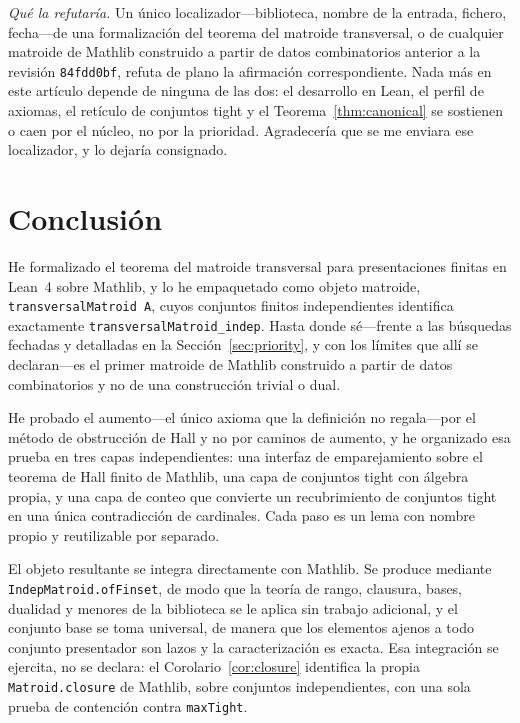 \documentclass[11pt]{article}
\newcommand{\lean}[1]{\texttt{#1}}
\begin{document}
\emph{Qué la refutaría.} Un único localizador---biblioteca, nombre de la entrada, fichero,
fecha---de una formalización del teorema del matroide transversal, o de cualquier matroide de
Mathlib construido a partir de datos combinatorios anterior a la revisión \lean{84fdd0bf}, refuta
de plano la afirmación correspondiente. Nada más en este artículo depende de ninguna de las dos: el
desarrollo en Lean, el perfil de axiomas, el retículo de conjuntos tight y el
Teorema~\ref{thm:canonical} se sostienen o caen por el núcleo, no por la prioridad. Agradecería que
se me enviara ese localizador, y lo dejaría consignado.

\section{Conclusión}\label{sec:conclusion}

He formalizado el teorema del matroide transversal para presentaciones finitas en Lean~4 sobre
Mathlib, y lo he empaquetado como objeto matroide, \lean{transversalMatroid A}, cuyos conjuntos
finitos independientes identifica exactamente \lean{transversalMatroid\_indep}. Hasta donde
sé---frente a las búsquedas fechadas y detalladas en la Sección~\ref{sec:priority}, y con los
límites que allí se declaran---es el primer matroide de Mathlib construido a partir de datos
combinatorios y no de una construcción trivial o dual.

He probado el aumento---el único axioma que la definición no regala---por el método de obstrucción
de Hall y no por caminos de aumento, y he organizado esa prueba en tres capas independientes: una
interfaz de emparejamiento sobre el teorema de Hall finito de Mathlib, una capa de conjuntos tight
con álgebra propia, y una capa de conteo que convierte un recubrimiento de conjuntos tight en una
única contradicción de cardinales. Cada paso es un lema con nombre propio y reutilizable por
separado.

{\sloppy El objeto resultante se integra directamente con Mathlib. Se produce mediante
\lean{IndepMatroid.ofFinset}, de modo que la teoría de rango, clausura, bases, dualidad y menores de
la biblioteca se le aplica sin trabajo adicional, y el conjunto base se toma universal, de manera
que los elementos ajenos a todo conjunto presentador son lazos y la caracterización es exacta. Esa
integración se ejercita, no se declara: el Corolario~\ref{cor:closure} identifica la propia
\lean{Matroid.closure} de Mathlib, sobre conjuntos independientes, con una sola prueba de
contención contra \lean{maxTight}.\par}
\end{document}
